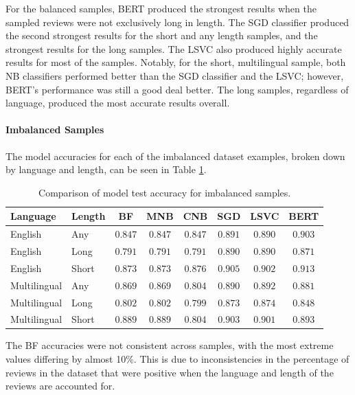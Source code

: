 For the balanced samples, BERT produced the strongest results when the sampled reviews were not exclusively long in length. The SGD classifier produced the second strongest results for the short and any length samples, and the strongest results for the long samples. The LSVC also produced highly accurate results for most of the samples. Notably, for the short, multilingual sample, both NB classifiers performed better than the SGD classifier and the LSVC; however, BERT's performance was still a good deal better. The long samples, regardless of language, produced the most accurate results overall.

\paragraph{Imbalanced Samples}

The model accuracies for each of the imbalanced dataset examples, broken down by language and length, can be seen in Table \ref{tab:Res_RF_Pol_CompImb}.

\begin{table}[ht]
    \centering
    \begin{tabular}{l l | c c c c c c}
        \toprule
        \textbf{Language} & \textbf{Length} & \textbf{BF} & \textbf{MNB} & \textbf{CNB} & \textbf{SGD} & \textbf{LSVC} & \textbf{BERT}\\\midrule
        English & Any &$0.847$&$0.847$&$0.847$&$0.891$&$0.890$&$\mathbf{0.903}$\\
        English & Long & $0.791$&$0.791$&$0.791$&$0.890$&$\mathbf{0.890}$&$0.871$\\
        English & Short & $0.873$&$0.873$&$0.876$&$0.905$&$0.902$&$\mathbf{0.913}$\\\midrule
        Multilingual & Any &$0.869$&$0.869$&$0.804$&$0.890$&$\mathbf{0.892}$&$0.881$\\
        Multilingual & Long & $0.802$&$0.802$&$0.799$&$0.873$&$\mathbf{0.874}$&$0.848$\\
        Multilingual & Short & $0.889$&$0.889$&$0.804$&$\mathbf{0.903}$&$0.901$&$0.893$\\
        \bottomrule
    \end{tabular}
    \caption{Comparison of model test accuracy for imbalanced samples.}
    \label{tab:Res_RF_Pol_CompImb}
\end{table}

The BF accuracies were not consistent across samples, with the most extreme values differing by almost 10\%. This is due to inconsistencies in the percentage of reviews in the dataset that were positive when the language and length of the reviews are accounted for.

